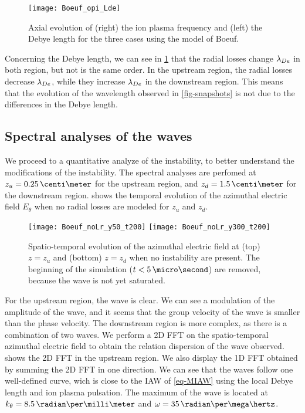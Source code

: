 \begin{figure}[hbtp]
  \centering
  \texttt{[image: Boeuf\_opi\_Lde]}
  \caption{Axial evolution of (right) the ion plasma frequency and (left) the Debye length for the three cases using the model of Boeuf.}
  \label{fig-wpi_Lde}
\end{figure}

Concerning the Debye length, we can see in \cref{fig-wpi_Lde} that the radial losses change $\lambda_{De}$ in both region, but not is the same order.
In the upstream region, the radial losses decrease $\lambda_{De}$, while they increase $\lambda_{De}$ in the downstream region.
This means that the evolution of the wavelength observed in \cref{fig-snapshots} is not due to the differences in the Debye length.

\subsection{Spectral analyses of the waves} \label{subsec-fft}

We proceed to a quantitative analyze of the instability, to better understand the modifications of the instability.
The spectral analyses are perfomed at $z_u=0.25\,\centi\meter$ for the upstream region, and $z_d=1.5\,\centi\meter$ for the downstream region.
 shows the temporal evolution of the azimuthal electric field $E_{\theta}$ when no radial losses are modeled for $z_u$ and $z_d$.

\begin{figure}[hbtp]
  \centering
  \texttt{[image: Boeuf\_noLr\_y50\_t200]}
  \texttt{[image: Boeuf\_noLr\_y300\_t200]}
  \caption{Spatio-temporal evolution of the azimuthal electric field at (top) $z=z_u$ and (bottom) $z=z_d$ when no instability are present. The beginning of the simulation ($t<5\,\micro\second$) are removed, because the wave is not yet saturated. }
  \label{fig-cut2D}
\end{figure}


For the upstream region, the wave is clear. 
We can see a modulation of the amplitude of the wave, and it seems that the group velocity of the wave is smaller than the phase velocity.
The downstream region is more complex, as there is a combination of two waves.
We perform a \ac{2D} \ac{FFT} on the spatio-temporal azimuthal electric field to obtain the relation dispersion of the wave observed.
 shows the \ac{2D} \ac{FFT} in the upstream region.
We also display the \ac{1D} \ac{FFT} obtained by summing the \ac{2D} \ac{FFT} in one direction.
We can see that the waves follow one well-defined curve, wich is close to the \ac{IAW} of \cref{eq-MIAW} using the local Debye length and ion plasma pulsation.
The maximum of the wave is located at $k_{\theta} = 8.5\,\radian\per\milli\meter$ and $\omega = 35\, \radian\per\mega\hertz$.

